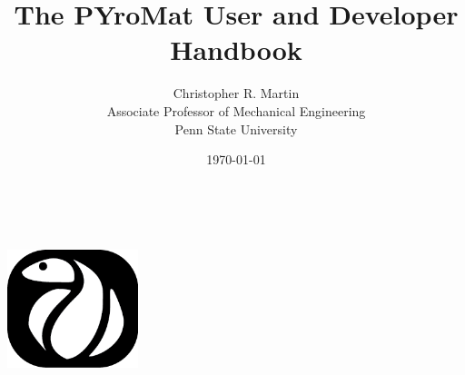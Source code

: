 \documentclass[11pt]{report}
\title{The PYroMat User and Developer Handbook}
\author{Christopher R. Martin\\
Associate Professor of Mechanical Engineering\\
Penn State University}
\date{\today}
\begin{document}
\pagestyle{empty}
\ \\
\vspace{2in}

\begin{center}
\includegraphics[width=1.5in]{figures/PYro_Black_Small}
\end{center}
\pagebreak

\maketitle

\pagebreak
\pagestyle{plain}

\tableofcontents













\end{document}
